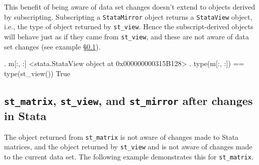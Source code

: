 \documentclass{article}
\begin{document}
\medskip

This benefit of being aware of data set changes doesn't extend to objects derived by subscripting. Subscripting a \lstinline$StataMirror$ object returns a \lstinline$StataView$ object, i.e., the type of object returned by \lstinline{st_view}. Hence the subscript-derived objects will behave just as if they came from \lstinline{st_view}, and these are not aware of data set changes (see example \S\ref{after_changes_example}).

\begin{stlog}
{\smallskip}
{\bftt{>>>}}. m[:, :]
<stata.StataView object at 0x000000000315B128>
{\smallskip}
{\bftt{>>>}}. type(m[:, :]) == type(st_view())
True
\end{stlog}

\smallskip


\subsection{\lstinline$st_matrix$, \lstinline$st_view$, and \lstinline$st_mirror$ after changes in Stata} \label{after_changes_example}

The object returned from \lstinline{st_matrix} is not aware of changes made to Stata matrices, and the object returned by \lstinline{st_view} and is not aware of changes made to the current data set. The following example demonstrates this for \lstinline{st_matrix}.
\end{document}
